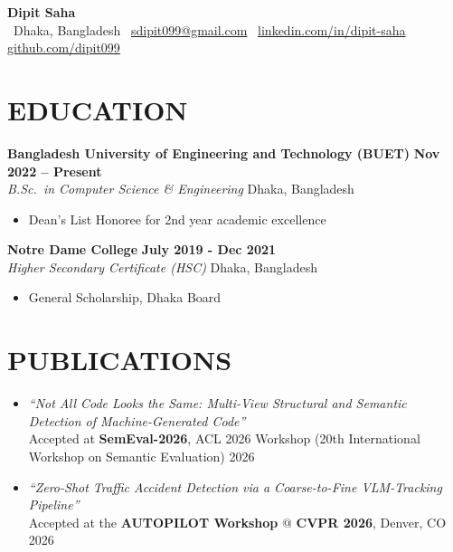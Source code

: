 \documentclass[letterpaper,10pt]{article}
\begin{document}
\begin{center}
    {\LARGE \textbf{Dipit Saha}} \\[3pt]
    \small
    \, Dhaka, Bangladesh \quad
    \, \href{mailto:sdipit099@gmail.com}{sdipit099@gmail.com} \quad
    \, \href{https://www.linkedin.com/in/dipit-saha/}{linkedin.com/in/dipit-saha} \quad
    \, \href{https://github.com/dipit099}{github.com/dipit099}
\end{center}
\vspace{-4pt}

\section{EDUCATION}

\textbf{Bangladesh University of Engineering and Technology (BUET)} \hfill \textbf{Nov 2022 -- Present} \\
\textit{B.Sc.\ in Computer Science \& Engineering} \hfill Dhaka, Bangladesh
\begin{itemize}
    \item Dean's List Honoree for 2nd year academic excellence
\end{itemize}

\vspace{1pt}
\textbf{Notre Dame College} \hfill \textbf{July 2019 - Dec 2021} \\
\textit{Higher Secondary Certificate (HSC)} \hfill Dhaka, Bangladesh
\begin{itemize}
    \item General Scholarship, Dhaka Board
\end{itemize}

\section{PUBLICATIONS}
\begin{itemize}
    \item \textit{``Not All Code Looks the Same: Multi-View Structural and Semantic Detection of Machine-Generated Code''} \\
    Accepted at \textbf{SemEval-2026}, ACL 2026 Workshop (20th International Workshop on Semantic Evaluation) \hfill 2026
    \item \textit{``Zero-Shot Traffic Accident Detection via a Coarse-to-Fine VLM-Tracking Pipeline''} \\
    Accepted at the \textbf{AUTOPILOT Workshop} @ \textbf{CVPR 2026}, Denver, CO \hfill 2026
\end{itemize}
\end{document}
